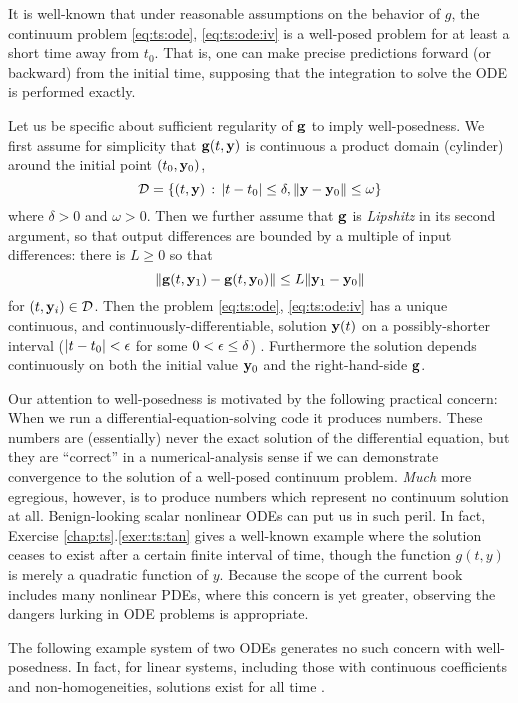 It is well-known that under reasonable assumptions on the behavior of $g$, the continuum problem \eqref{eq:ts:ode}, \eqref{eq:ts:ode:iv} is a well-posed problem for at least a short time away from $t_0$.  That is, one can make precise predictions forward (or backward) from the initial time, supposing that the integration to solve the ODE is performed exactly.

Let us be specific about sufficient regularity of $\mathbf{g}$ to imply well-posedness.  We first assume for simplicity that $\mathbf{g}(t,\mathbf{y})$ is continuous a product domain (cylinder) around the initial point $(t_0,\mathbf{y}_0)$,
   $$\mathcal{D} = \{(t,\mathbf{y}) \,:\, |t-t_0| \le \delta, \|\mathbf{y} - \mathbf{y}_0\| \le \omega\}$$
where $\delta > 0$ and $\omega > 0$.  Then we further assume that $\mathbf{g}$ is \emph{Lipshitz} in its second argument, so that output differences are bounded by a multiple of input differences: there is $L\ge 0$ so that
   $$\|\mathbf{g}(t,\mathbf{y}_1) - \mathbf{g}(t,\mathbf{y}_0)\| \le L \|\mathbf{y}_1-\mathbf{y}_0\|$$
for $(t,\mathbf{y}_i) \in \mathcal{D}$.  Then the problem \eqref{eq:ts:ode}, \eqref{eq:ts:ode:iv} has a unique continuous, and continuously-differentiable, solution $\mathbf{y}(t)$ on a possibly-shorter interval ($|t-t_0|<\epsilon$ for some $0 < \epsilon \le \delta$) \citep[section 17.5]{HirschSmaleDevaney2004}.  Furthermore the solution depends continuously on both the initial value $\mathbf{y}_0$ and the right-hand-side $\mathbf{g}$.

Our attention to well-posedness is motivated by the following practical concern:  When we run a differential-equation-solving code it produces numbers.  These numbers are (essentially) never the exact solution of the differential equation, but they are ``correct'' in a numerical-analysis sense if we can demonstrate convergence to the solution of a well-posed continuum problem.  \emph{Much} more egregious, however, is to produce numbers which represent no continuum solution at all.  Benign-looking scalar nonlinear ODEs can put us in such peril.  In fact, Exercise \ref{chap:ts}.\ref{exer:ts:tan} gives a well-known example where the solution ceases to exist after a certain finite interval of time, though the function $g(t,y)$ is merely a quadratic function of $y$.  Because the scope of the current book includes many nonlinear PDEs, where this concern is yet greater, observing the dangers lurking in ODE problems is appropriate.

The following example system of two ODEs generates no such concern with well-posedness.  In fact, for linear systems, including those with continuous coefficients and non-homogeneities, solutions exist for all time \citep[section 17.5]{HirschSmaleDevaney2004}.

